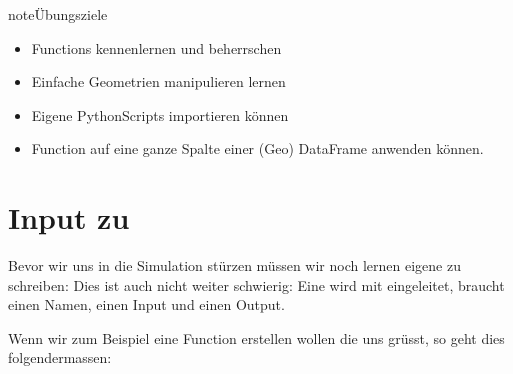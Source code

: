 \documentclass[letterpaper,10pt,english]{sphinxmanual}
\begin{document}
\begin{sphinxadmonition}{note}{Übungsziele}
\begin{itemize}
\item {} 
Functions kennenlernen und beherrschen

\item {} 
Einfache Geometrien manipulieren lernen

\item {} 
Eigene Python\sphinxhyphen{}Scripts importieren können

\item {} 
Function auf eine ganze Spalte einer (Geo\sphinxhyphen{}) DataFrame anwenden können.

\end{itemize}
\end{sphinxadmonition}


\chapter{Input zu }
\label{\detokenize{02_02_Input_Functions:input-zu-functions}}\label{\detokenize{02_02_Input_Functions::doc}}
Bevor wir uns in die Simulation stürzen müssen wir noch lernen eigene  zu schreiben: Dies ist auch nicht weiter schwierig: Eine  wird mit  eingeleitet, braucht einen Namen, einen Input und einen Output.

Wenn wir zum Beispiel eine Function erstellen wollen die uns grüsst, so geht dies folgendermassen:
\end{document}
